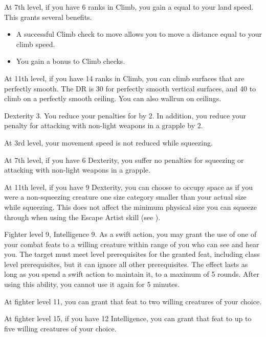     At 7th level, if you have 6 ranks in Climb, you gain a  equal to your land speed.
    This grants several benefits.
    \begin{itemize}
        \item A successful Climb check to move allows you to move a distance equal to your climb speed.
        \item You gain a  bonus to Climb checks.
    \end{itemize}

    At 11th level, if you have 14 ranks in Climb, you can climb surfaces that are perfectly smooth.
    The DR is 30 for perfectly smooth vertical surfaces, and 40 to climb on a perfectly smooth ceiling.
    You can also wallrun on ceilings.

    \featpre Dexterity 3.
    \featben You reduce your penalties for  by 2. In addition, you reduce your penalty for attacking with non-light weapons in a grapple by 2.

    At 3rd level, your movement speed is not reduced while squeezing.

    At 7th level, if you have 6 Dexterity, you suffer no penalties for squeezing or attacking with non-light weapons in a grapple.

    At 11th level, if you have 9 Dexterity, you can choose to occupy space as if you were a non-squeezing creature one size category smaller than your actual size while squeezing.
    This does not affect the minimum physical size you can squeeze through when using the Escape Artist skill (see ).

    \featpres Fighter level 9, Intelligence 9.
    \featben As a swift action, you may grant the use of one of your combat feats to a willing creature within \rngmed range of you who can see and hear you.
    The target must meet level prerequisites for the granted feat, including class level prerequisites, but it can ignore all other prerequisites.
    The effect lasts as long as you spend a swift action to maintain it, to a maximum of 5 rounds.
    After using this ability, you cannot use it again for 5 minutes.

    At fighter level 11, you can grant that feat to two willing creatures of your choice.

    At fighter level 15, if you have 12 Intelligence, you can grant that feat to up to five willing creatures of your choice.

